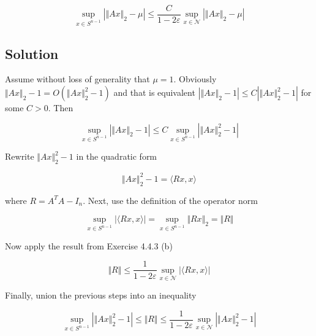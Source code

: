 \documentclass{article}
\begin{document}
$$\sup_{x \in S^{n-1}}|\Vert Ax \Vert_2 - \mu| \leq \frac{C}{1 - 2\varepsilon}\sup_{x \in \mathcal N}|\Vert Ax \Vert_2 - \mu|$$

\subsection{Solution}

Assume without loss of generality that $\mu = 1$. Obviously $\Vert Ax \Vert_2 - 1 = O(\Vert Ax\Vert_2^2 - 1)$ and that is equivalent $|\Vert Ax \Vert_2 - 1| \leq C |\Vert Ax \Vert_2^2 - 1|$ for some $C>0$. Then

$$\sup_{x \in S^{n-1}}|\Vert Ax \Vert_2 - 1| \leq C\sup_{x \in S^{n-1}}|\Vert Ax \Vert_2^2 - 1|$$

Rewrite $\Vert Ax \Vert_2^2 - 1$ in the quadratic form

$$\Vert Ax \Vert_2^2 - 1 = \langle Rx, x \rangle$$

where $R = A^TA - I_n$. Next, use the definition of the operator norm

$$\sup_{x \in S^{n-1}}|\langle Rx, x \rangle| = \sup_{x \in S^{n-1}} \Vert Rx \Vert_2 = \Vert R \Vert$$

Now apply the result from Exercise 4.4.3 (b)

$$\Vert R \Vert \leq \frac{1}{1-2\varepsilon}\sup_{x \in \mathcal N}|\langle Rx, x \rangle|$$

Finally, union the previous steps into an inequality

$$\sup_{x \in S^{n-1}}|\Vert Ax \Vert_2^2 - 1| \leq \Vert R \Vert \leq \frac{1}{1-2\varepsilon}\sup_{x \in \mathcal N}|\Vert Ax \Vert_2^2 - 1| $$
\end{document}
